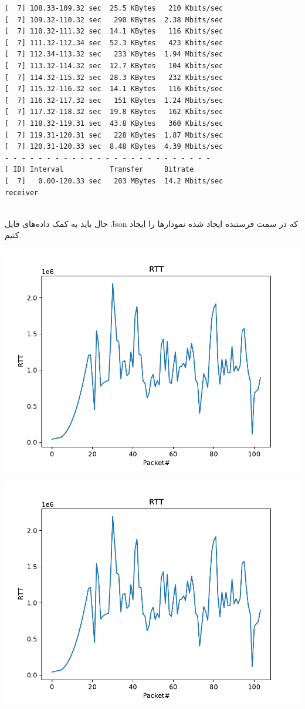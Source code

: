 \documentclass[12pt]{article}
\begin{document}
\begin{enumerate}
\begin{latin}
\begin{Verbatim}
[  7] 108.33-109.32 sec  25.5 KBytes   210 Kbits/sec                  
[  7] 109.32-110.32 sec   290 KBytes  2.38 Mbits/sec                  
[  7] 110.32-111.32 sec  14.1 KBytes   116 Kbits/sec                  
[  7] 111.32-112.34 sec  52.3 KBytes   423 Kbits/sec                  
[  7] 112.34-113.32 sec   233 KBytes  1.94 Mbits/sec                  
[  7] 113.32-114.32 sec  12.7 KBytes   104 Kbits/sec                  
[  7] 114.32-115.32 sec  28.3 KBytes   232 Kbits/sec                  
[  7] 115.32-116.32 sec  14.1 KBytes   116 Kbits/sec                  
[  7] 116.32-117.32 sec   151 KBytes  1.24 Mbits/sec                  
[  7] 117.32-118.32 sec  19.8 KBytes   162 Kbits/sec                  
[  7] 118.32-119.31 sec  43.8 KBytes   360 Kbits/sec                  
[  7] 119.31-120.31 sec   228 KBytes  1.87 Mbits/sec                  
[  7] 120.31-120.33 sec  8.48 KBytes  4.39 Mbits/sec                  
- - - - - - - - - - - - - - - - - - - - - - - - -
[ ID] Interval           Transfer     Bitrate
[  7]   0.00-120.33 sec   203 MBytes  14.2 Mbits/sec                  receiver


\end{Verbatim}
\end{latin}

حال باید به کمک داده‌های فایل Json که در سمت فرستنده ایجاد شده نمودارها را ایجاد کنیم.

\begin{center}
	\includegraphics[page=1, width = 0.6 \textwidth]{images/plots.pdf}
\end{center}

\begin{center}
	\includegraphics[page=2, width = 0.6 \textwidth]{images/plots.pdf}
\end{center}


\end{enumerate}
\end{document}
